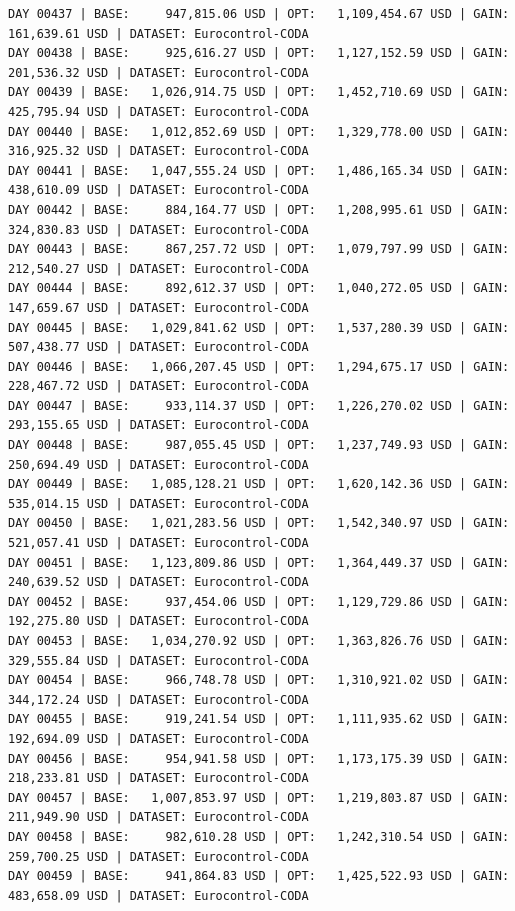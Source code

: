 \documentclass[11pt,a4paper]{article}
\begin{document}
\begin{verbatim}
DAY 00437 | BASE:     947,815.06 USD | OPT:   1,109,454.67 USD | GAIN: 161,639.61 USD | DATASET: Eurocontrol-CODA
DAY 00438 | BASE:     925,616.27 USD | OPT:   1,127,152.59 USD | GAIN: 201,536.32 USD | DATASET: Eurocontrol-CODA
DAY 00439 | BASE:   1,026,914.75 USD | OPT:   1,452,710.69 USD | GAIN: 425,795.94 USD | DATASET: Eurocontrol-CODA
DAY 00440 | BASE:   1,012,852.69 USD | OPT:   1,329,778.00 USD | GAIN: 316,925.32 USD | DATASET: Eurocontrol-CODA
DAY 00441 | BASE:   1,047,555.24 USD | OPT:   1,486,165.34 USD | GAIN: 438,610.09 USD | DATASET: Eurocontrol-CODA
DAY 00442 | BASE:     884,164.77 USD | OPT:   1,208,995.61 USD | GAIN: 324,830.83 USD | DATASET: Eurocontrol-CODA
DAY 00443 | BASE:     867,257.72 USD | OPT:   1,079,797.99 USD | GAIN: 212,540.27 USD | DATASET: Eurocontrol-CODA
DAY 00444 | BASE:     892,612.37 USD | OPT:   1,040,272.05 USD | GAIN: 147,659.67 USD | DATASET: Eurocontrol-CODA
DAY 00445 | BASE:   1,029,841.62 USD | OPT:   1,537,280.39 USD | GAIN: 507,438.77 USD | DATASET: Eurocontrol-CODA
DAY 00446 | BASE:   1,066,207.45 USD | OPT:   1,294,675.17 USD | GAIN: 228,467.72 USD | DATASET: Eurocontrol-CODA
DAY 00447 | BASE:     933,114.37 USD | OPT:   1,226,270.02 USD | GAIN: 293,155.65 USD | DATASET: Eurocontrol-CODA
DAY 00448 | BASE:     987,055.45 USD | OPT:   1,237,749.93 USD | GAIN: 250,694.49 USD | DATASET: Eurocontrol-CODA
DAY 00449 | BASE:   1,085,128.21 USD | OPT:   1,620,142.36 USD | GAIN: 535,014.15 USD | DATASET: Eurocontrol-CODA
DAY 00450 | BASE:   1,021,283.56 USD | OPT:   1,542,340.97 USD | GAIN: 521,057.41 USD | DATASET: Eurocontrol-CODA
DAY 00451 | BASE:   1,123,809.86 USD | OPT:   1,364,449.37 USD | GAIN: 240,639.52 USD | DATASET: Eurocontrol-CODA
DAY 00452 | BASE:     937,454.06 USD | OPT:   1,129,729.86 USD | GAIN: 192,275.80 USD | DATASET: Eurocontrol-CODA
DAY 00453 | BASE:   1,034,270.92 USD | OPT:   1,363,826.76 USD | GAIN: 329,555.84 USD | DATASET: Eurocontrol-CODA
DAY 00454 | BASE:     966,748.78 USD | OPT:   1,310,921.02 USD | GAIN: 344,172.24 USD | DATASET: Eurocontrol-CODA
DAY 00455 | BASE:     919,241.54 USD | OPT:   1,111,935.62 USD | GAIN: 192,694.09 USD | DATASET: Eurocontrol-CODA
DAY 00456 | BASE:     954,941.58 USD | OPT:   1,173,175.39 USD | GAIN: 218,233.81 USD | DATASET: Eurocontrol-CODA
DAY 00457 | BASE:   1,007,853.97 USD | OPT:   1,219,803.87 USD | GAIN: 211,949.90 USD | DATASET: Eurocontrol-CODA
DAY 00458 | BASE:     982,610.28 USD | OPT:   1,242,310.54 USD | GAIN: 259,700.25 USD | DATASET: Eurocontrol-CODA
DAY 00459 | BASE:     941,864.83 USD | OPT:   1,425,522.93 USD | GAIN: 483,658.09 USD | DATASET: Eurocontrol-CODA

\end{verbatim}
\end{document}
